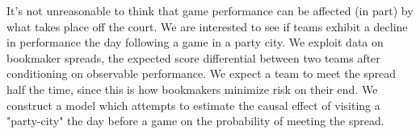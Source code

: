 \documentclass[24pt, a0paper, portrait]{tikzposter}
\begin{document}
   \maketitle

 {     It's not unreasonable to think that game performance can be affected (in part) by what takes place off the court. We are interested to see if teams exhibit a decline in performance the day following a game in a party city. We exploit data on bookmaker spreads, the expected score differential between two teams after conditioning on observable performance. We expect a team to meet the spread half the time, since this is how bookmakers minimize risk on their end. We construct a model which attempts to estimate the causal effect of  visiting a "party-city" the day before a game on the probability of meeting the spread. }

\end{document}
